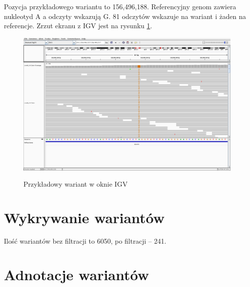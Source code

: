 \documentclass[a4paper]{article}
\begin{document}
Pozycja przykładowego wariantu to 156,496,188.
Referencyjny genom zawiera nukleotyd A a odczyty wskazują G.
81 odczytów wskazuje na wariant i żaden na referencje.
Zrzut ekranu z IGV jest na rysunku \ref{fig:igv}.

\begin{figure}[h]
    \centering
    \includegraphics[width=1.0\textwidth]{sampleVariant.png}
    \label{fig:igv}
    \caption[]{Przykładowy wariant w oknie IGV}
\end{figure}


\section{Wykrywanie wariantów}  

Ilość wariantów bez filtracji to 6050, po filtracji -- 241.

\section{Adnotacje wariantów}  
\end{document}
